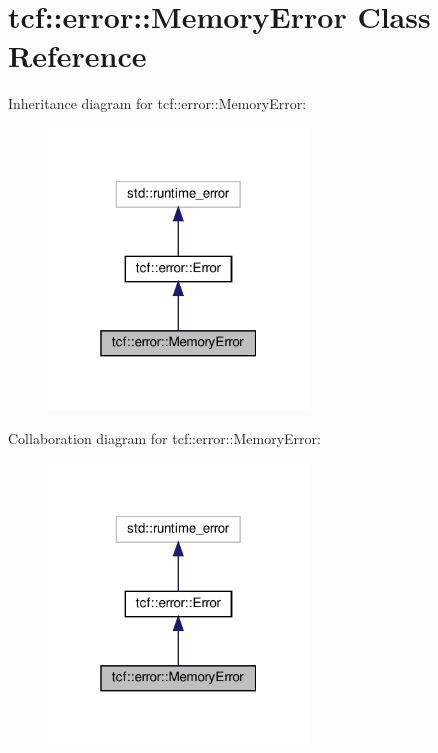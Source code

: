 \hypertarget{classtcf_1_1error_1_1MemoryError}{}\section{tcf\+:\+:error\+:\+:Memory\+Error Class Reference}
\label{classtcf_1_1error_1_1MemoryError}


Inheritance diagram for tcf\+:\+:error\+:\+:Memory\+Error\+:
\nopagebreak
\begin{figure}[H]
\begin{center}
\leavevmode
\includegraphics[width=196pt]{classtcf_1_1error_1_1MemoryError__inherit__graph}
\end{center}
\end{figure}


Collaboration diagram for tcf\+:\+:error\+:\+:Memory\+Error\+:
\nopagebreak
\begin{figure}[H]
\begin{center}
\leavevmode
\includegraphics[width=196pt]{classtcf_1_1error_1_1MemoryError__coll__graph}
\end{center}
\end{figure}
